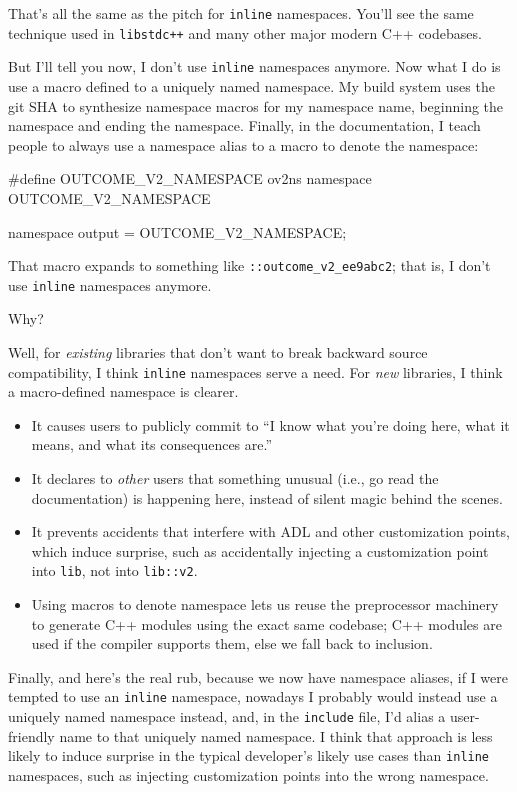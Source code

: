 That's all the same as the pitch for \lstinline!inline! namespaces. You'll
see the same technique used in \lstinline!libstdc++! and many other major modern C++
codebases.

But I'll tell you now, I don't use \lstinline!inline! namespaces anymore.
Now what I do is use a macro defined to a uniquely named namespace. My
build system uses the git SHA to synthesize namespace macros for my
namespace name, beginning the namespace and ending the namespace.
Finally, in the documentation, I teach people to always use a namespace
alias to a macro to denote the namespace:

\begin{emcppshiddenlisting}[emcppsbatch=e10]
#define OUTCOME_V2_NAMESPACE ov2ns
namespace OUTCOME_V2_NAMESPACE {
}
\end{emcppshiddenlisting}
\begin{emcppslisting}[emcppsbatch=e10]
namespace output = OUTCOME_V2_NAMESPACE;
\end{emcppslisting}

\noindent That macro expands to something like \lstinline!::outcome_v2_ee9abc2!;
that is, I don't use \lstinline!inline! namespaces anymore.

Why?

Well, for \emph{existing} libraries that don't want to break backward
source compatibility, I think \lstinline!inline! namespaces serve a need.
For \emph{new} libraries, I think a macro-defined namespace is clearer.
\begin{itemize}
\item{It causes users to publicly commit to ``I know what you’re doing here, what it means, and what its consequences are.''}
\item{It declares to \emph{other} users that something unusual (i.e., go read the documentation) is happening here, instead of silent magic behind the scenes.}
\item{It prevents accidents that interfere with ADL and other customization points, which induce surprise, such as accidentally injecting a customization point into \lstinline!lib!, not into \lstinline!lib::v2!.}
\item{Using macros to denote namespace lets us reuse the preprocessor machinery to generate C++ modules using the exact same codebase; C++ modules are used if the compiler supports them, else we fall back to inclusion.}
\end{itemize}

Finally, and here's the real rub, because we now have namespace aliases,
if I were tempted to use an \lstinline!inline! namespace, nowadays I probably would
instead use a uniquely named namespace instead, and, in the \lstinline!include! file,
I'd alias a user-friendly name to that uniquely named namespace. I think
that approach is less likely to induce surprise in the typical
developer's likely use cases than \lstinline!inline! namespaces, such as
injecting customization points into the wrong namespace.

